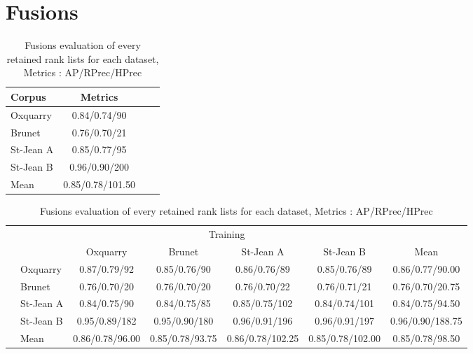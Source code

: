 \section{Fusions}

\begin{table}[H]
  \centering
  \caption{Fusions evaluation of every retained rank lists for each dataset, Metrics : AP/RPrec/HPrec}
  \label{tab:fusions_scores}

  \begin{tabular}{l c c c}
    \toprule
    Corpus         & Metrics \\
    \midrule
    Oxquarry       & 0.84/0.74/90 \\
    Brunet         & 0.76/0.70/21 \\
    St-Jean A      & 0.85/0.77/95 \\
    St-Jean B      & 0.96/0.90/200 \\
    \midrule
    Mean           & 0.85/0.78/101.50 \\
    \bottomrule
  \end{tabular}

  \vspace{0.5cm}

  \begin{tabular}{l l| c c c c|c}
    \toprule
    \multicolumn{2}{c}{\multirow{2}{*}{}} & \multicolumn{4}{c}{Training} \\
    \multicolumn{2}{c}{} & Oxquarry & Brunet & St-Jean A & St-Jean B & Mean \\
    \midrule
    \parbox[t]{2mm}{}
    & Oxquarry  & 0.87/0.79/92 & 0.85/0.76/90 & 0.86/0.76/89 & 0.85/0.76/89 & 0.86/0.77/90.00 \\
    & Brunet    & 0.76/0.70/20 & 0.76/0.70/20 & 0.76/0.70/22 & 0.76/0.71/21 & 0.76/0.70/20.75 \\
    & St-Jean A & 0.84/0.75/90 & 0.84/0.75/85 & 0.85/0.75/102 & 0.84/0.74/101 & 0.84/0.75/94.50 \\
    & St-Jean B & 0.95/0.89/182 & 0.95/0.90/180 & 0.96/0.91/196 & 0.96/0.91/197 & 0.96/0.90/188.75 \\
    \midrule
    & Mean      & 0.86/0.78/96.00 & 0.85/0.78/93.75 & 0.86/0.78/102.25 & 0.85/0.78/102.00 & 0.85/0.78/98.50 \\
    \bottomrule
  \end{tabular}

\end{table}
